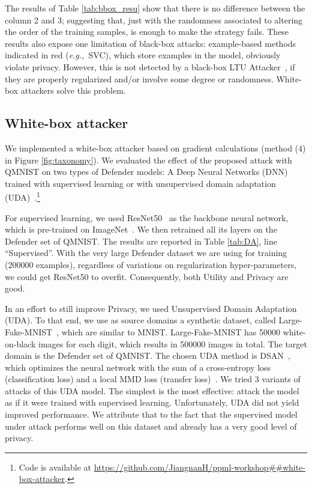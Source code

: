 \documentclass[letterpaper]{article}
\newcommand{\eg}{{\em e.g.,~}}
\newcommand{\oracle}{LTU Attacker~}
\begin{document}
The results of Table \ref{tab:bbox_resu} show that there is no difference between the column 2 and 3; suggesting that, just with the randomness associated to altering the order of the training samples, is enough to make the strategy fails.
These results also expose one limitation of black-box attacks: example-based methods indicated in red (\eg SVC), which store examples in the model, obviously violate privacy. However, this is not detected by a black-box \oracle, if they are properly regularized and/or involve some degree or randomness. White-box attackers solve this problem.



\subsection{White-box attacker}
We implemented a white-box attacker based on gradient calculations (method (4) in Figure \ref{fig:taxonomy}). We evaluated the effect of the proposed attack with QMNIST on two types of Defender models: A Deep Neural Networks (DNN) trained with supervised learning or with unsupervised domain adaptation (UDA)~\cite{deepdaJindong}.\footnote{Code is available at \url{https://github.com/JiangnanH/ppml-workshop##white-box-attacker}.}


For supervised learning, we used ResNet50~\cite{he2016deep} as the backbone neural network, which is pre-trained on ImageNet~\cite{deng2009imagenet}. We then retrained all its layers on the Defender set of QMNIST. The results are reported in Table \ref{tab:DA}, line ``Supervised''. With the very large Defender dataset we are using for training (200000 examples), regardless of variations on regularization hyper-parameters, we could get ResNet50 to overfit. Consequently, both Utility and Privacy are good.

In an effort to still improve Privacy, we used Unsupervised Domain Adaptation (UDA). To that end, we use as source domains  a synthetic dataset, called Large-Fake-MNIST~\cite{sun2021omniprint}, which are similar to MNIST. Large-Fake-MNIST has 50000 white-on-black images for each digit, which results in 500000 images in total. The target domain is the Defender set of QMNIST. The chosen UDA method is DSAN~\cite{zhuDeepSubdomainAdaptation2021,deepdaJindong}, which optimizes the neural network with the sum of a cross-entropy loss (classification loss) and a local MMD loss (transfer loss)~\cite{zhuDeepSubdomainAdaptation2021}. We tried 3 variants of attacks of this UDA model. The simplest is the most effective: attack the model as if it were trained with supervised learning. Unfortunately, UDA did not yield improved performance. We attribute that to the fact that the supervised model under attack performs well on this dataset and already has a very good level of privacy.
\end{document}
